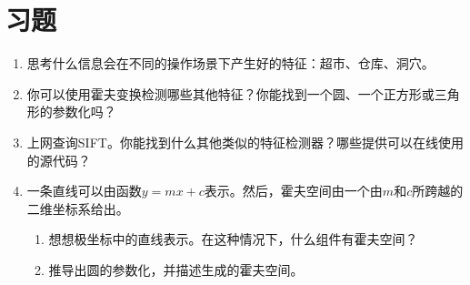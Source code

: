 \section*{习题}\small
\begin{enumerate}

\item 思考什么信息会在不同的操作场景下产生好的特征：超市、仓库、洞穴。
\item 你可以使用霍夫变换检测哪些其他特征？你能找到一个圆、一个正方形或三角形的参数化吗？
\item 上网查询SIFT。你能找到什么其他类似的特征检测器？哪些提供可以在线使用的源代码？
\item 一条直线可以由函数$y=mx+c$表示。然后，霍夫空间由一个由$m$和$c$所跨越的二维坐标系给出。
\begin{enumerate}

\item 想想极坐标中的直线表示。在这种情况下，什么组件有霍夫空间？
\item 推导出圆的参数化，并描述生成的霍夫空间。
\end{enumerate}
\end{enumerate}
\normalsize